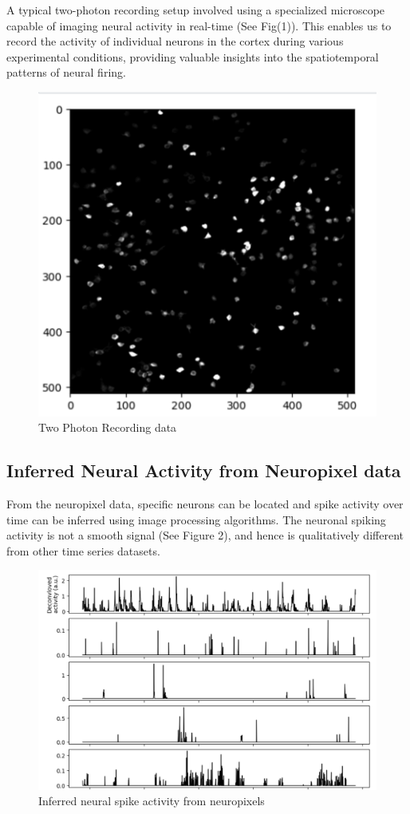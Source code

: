 \documentclass[12pt]{article}
\begin{document}
A typical two-photon recording setup involved using a specialized microscope capable of imaging neural activity in real-time (See Fig(1)). This enables us to record the activity of individual neurons in the cortex during various experimental conditions, providing valuable insights into the spatiotemporal patterns of neural firing. 
\begin{figure}[htbp] %
  \centering
  \includegraphics[width=0.75\linewidth]{neuropixel.png}
  \caption{Two Photon Recording data }
  \label{fig:your-label}
\end{figure}

\subsection{Inferred Neural Activity from Neuropixel data}
From the neuropixel data, specific neurons can be located and spike activity over time can be inferred using image processing algorithms. The neuronal spiking activity is not a smooth signal (See Figure 2), and hence is qualitatively different from other time series datasets. 

\begin{figure}[htbp] %
  \centering
  \includegraphics[width=0.75\linewidth]{neural_activity.png}
  \caption{Inferred neural spike activity from neuropixels }
  \label{fig:your-label}
\end{figure}
\end{document}

